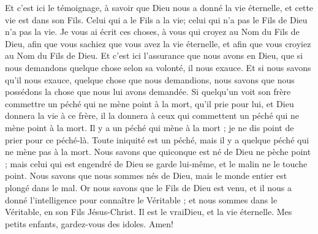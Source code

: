 \begin{multicols}{2}
Et c'est ici le témoignage, à savoir que Dieu nous a donné la vie éternelle, et cette vie est dans son Fils.
Celui qui a le Fils a la vie; celui qui n'a pas le Fils de Dieu n'a pas la vie.
Je vous ai écrit ces choses, à vous qui croyez au Nom du Fils de Dieu, afin que vous sachiez que vous avez la vie éternelle, et afin que vous croyiez au Nom du Fils de Dieu.
Et c'est ici l'assurance que nous avons en Dieu, que si nous demandons quelque chose selon sa volonté, il nous exauce.
Et si nous savons qu'il nous exauce, quelque chose que nous demandions, nous savons que nous possédons la chose que nous lui avons demandée.
Si quelqu'un voit son frère commettre un péché qui ne mène point à la mort, qu'il prie pour lui, et Dieu donnera la vie à ce frère, il la donnera à ceux qui commettent un péché qui ne mène point à la mort. Il y a un péché qui mène à la mort ; je ne dis point de prier pour ce péché-là.
Toute iniquité est un péché, mais il y a quelque péché qui ne mène pas à la mort.
Nous savons que quiconque est né de Dieu ne pèche point ; mais celui qui est engendré de Dieu se garde lui-même, et le malin ne le touche point.
Nous savons que nous sommes nés de Dieu, mais le monde entier est plongé dans le mal.
Or nous savons que le Fils de Dieu est venu, et il nous a donné l'intelligence pour connaître le Véritable ; et nous sommes dans le Véritable, en son Fils Jésus-Christ. Il est le vraiDieu, et la vie éternelle.
Mes petits enfants, gardez-vous des idoles. Amen!
\PPE{}
\end{multicols}
